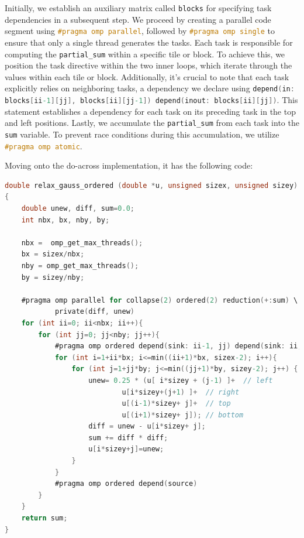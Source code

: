 \documentclass[titlepage]{article}
\newcommand{\incode}[1]{\lstinline[style=inlineC,language=C]{#1}}
\begin{document}
Initially, we establish an auxiliary matrix called \incode{blocks} for specifying task dependencies in a subsequent step. We proceed by creating a parallel code segment using \incode{#pragma omp parallel}, followed by \incode{#pragma omp single} to ensure that only a single thread generates the tasks. Each task is responsible for computing the \incode{partial_sum} within a specific tile or block. To achieve this, we position the task directive within the two inner loops, which iterate through the values within each tile or block. Additionally, it's crucial to note that each task explicitly relies on neighboring tasks, a dependency we declare using \incode{depend(in: blocks[ii-1][jj], blocks[ii][jj-1]) depend(inout: blocks[ii][jj])}. This statement establishes a dependency for each task on its preceding task in the top and left positions. Lastly, we accumulate the \incode{partial_sum} from each task into the \incode{sum} variable. To prevent race conditions during this accumulation, we utilize \incode{#pragma omp atomic}.

Moving onto the do-across implementation, it has the following code:

\begin{lstlisting}[style=c, language=C, caption=Gauss-Seidel with do-across, captionpos=b] 
double relax_gauss_ordered (double *u, unsigned sizex, unsigned sizey)
{
    double unew, diff, sum=0.0;
    int nbx, bx, nby, by;

    nbx =  omp_get_max_threads();
    bx = sizex/nbx;
    nby = omp_get_max_threads(); 
    by = sizey/nby;

    #pragma omp parallel for collapse(2) ordered(2) reduction(+:sum) \
            private(diff, unew)
    for (int ii=0; ii<nbx; ii++){
        for (int jj=0; jj<nby; jj++){
            #pragma omp ordered depend(sink: ii-1, jj) depend(sink: ii,jj-1) 
            for (int i=1+ii*bx; i<=min((ii+1)*bx, sizex-2); i++){
                for (int j=1+jj*by; j<=min((jj+1)*by, sizey-2); j++) {
                    unew= 0.25 * (u[ i*sizey + (j-1) ]+  // left
                            u[i*sizey+(j+1) ]+  // right
                            u[(i-1)*sizey+ j]+  // top
                            u[(i+1)*sizey+ j]); // bottom
                    diff = unew - u[i*sizey+ j];
                    sum += diff * diff; 
                    u[i*sizey+j]=unew;
                }
            }
            #pragma omp ordered depend(source)
        }
    }
    return sum;
}
\end{lstlisting}
\end{document}
